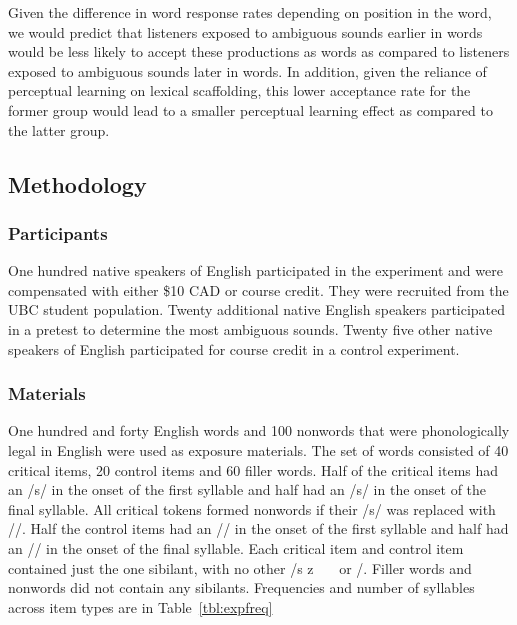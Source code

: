 Given the difference in word response rates depending on position in the word, we would predict that listeners exposed to ambiguous sounds earlier in words would be less likely to accept these productions as words as compared to listeners exposed to ambiguous sounds later in words.  In addition, given the reliance of perceptual learning on lexical scaffolding, this lower acceptance rate for the former group would lead to a smaller perceptual learning effect as compared to the latter group.

\subsection{Methodology}

\subsubsection{Participants}

One hundred native speakers of English participated in the experiment and were compensated with either \$10 CAD or course credit. 
They were recruited from the UBC student population.  
Twenty additional native English speakers participated in a pretest to determine the most ambiguous sounds.  
Twenty five other native speakers of English participated for course credit in a control experiment.

\subsubsection{Materials}

One hundred and forty English words and 100 nonwords that were phonologically legal in English were used as exposure materials.  
The set of words consisted of 40 critical items, 20 control items and 60 filler words.  
Half of the critical items had an /s/ in the onset of the first syllable and half had an /s/ in the onset of the final syllable.  
All critical tokens formed nonwords if their /s/ was replaced with /\textesh/. Half the control items had an /\textesh/ in the onset of the first syllable and half had an /\textesh/ in the onset of the final syllable.  
Each critical item and control item contained just the one sibilant, with no other /s z \textesh\ \textyogh\ \textteshlig\  or \textdyoghlig/.  
Filler words and nonwords did not contain any sibilants.  
Frequencies and number of syllables across item types are in Table~\ref{tbl:expfreq}

